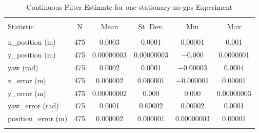 
\begin{table}[htbp] \centering 
  \caption{Continuous Filter Estimate for one-stationary-no-gps Experiment} 
  \label{tab:one_stationary_no_gps_continuous_summary} 
\begin{tabular}{@{\extracolsep{5pt}}lccccc} 
\\[-1.8ex]\hline 
\hline \\[-1.8ex] 
Statistic & \multicolumn{1}{c}{N} & \multicolumn{1}{c}{Mean} & \multicolumn{1}{c}{St. Dev.} & \multicolumn{1}{c}{Min} & \multicolumn{1}{c}{Max} \\ 
\hline \\[-1.8ex] 
x\_position (m) & 475 & \num{0.0003} & \num{0.0001} & \num{0.00001} & \num{0.001} \\ 
y\_position (m) & 475 & \num{0.00000003} & \num{0.00000003} & \num{-0.000} & \num{0.0000001} \\ 
yaw (rad) & 475 & \num{0.0002} & \num{0.0001} & \num{-0.00003} & \num{0.0004} \\ 
x\_error (m) & 475 & \num{0.000002} & \num{0.000001} & \num{-0.000001} & \num{0.00001} \\ 
y\_error (m) & 475 & \num{0.00000002} & \num{0.000} & \num{0.000} & \num{0.00000003} \\ 
yaw\_error (rad) & 475 & \num{0.0001} & \num{0.00002} & \num{0.00002} & \num{0.0001} \\ 
position\_error (m) & 475 & \num{0.000002} & \num{0.000001} & \num{0.00000003} & \num{0.00001} \\ 
\hline \\[-1.8ex] 
\end{tabular} 
\end{table} 
